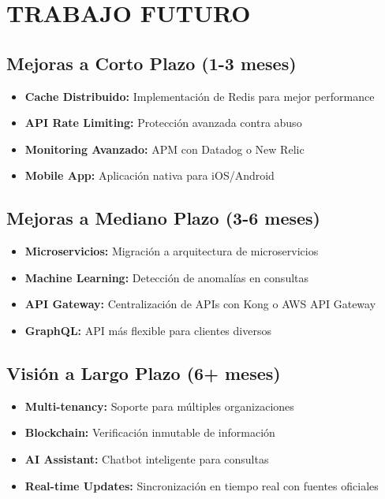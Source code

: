 \documentclass[12pt,a4paper]{article}
\begin{document}
\section{TRABAJO FUTURO}

\subsection{Mejoras a Corto Plazo (1-3 meses)}

\begin{itemize}
    \item \textbf{Cache Distribuido:} Implementación de Redis para mejor performance
    \item \textbf{API Rate Limiting:} Protección avanzada contra abuso
    \item \textbf{Monitoring Avanzado:} APM con Datadog o New Relic
    \item \textbf{Mobile App:} Aplicación nativa para iOS/Android
\end{itemize}

\subsection{Mejoras a Mediano Plazo (3-6 meses)}

\begin{itemize}
    \item \textbf{Microservicios:} Migración a arquitectura de microservicios
    \item \textbf{Machine Learning:} Detección de anomalías en consultas
    \item \textbf{API Gateway:} Centralización de APIs con Kong o AWS API Gateway
    \item \textbf{GraphQL:} API más flexible para clientes diversos
\end{itemize}

\subsection{Visión a Largo Plazo (6+ meses)}

\begin{itemize}
    \item \textbf{Multi-tenancy:} Soporte para múltiples organizaciones
    \item \textbf{Blockchain:} Verificación inmutable de información
    \item \textbf{AI Assistant:} Chatbot inteligente para consultas
    \item \textbf{Real-time Updates:} Sincronización en tiempo real con fuentes oficiales
\end{itemize}
\end{document}
